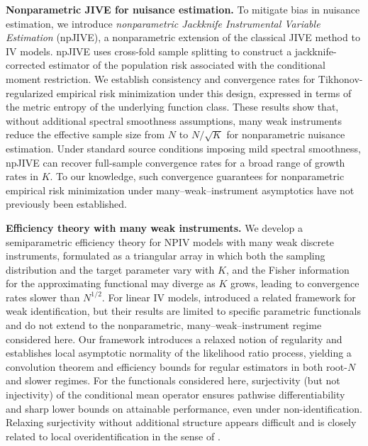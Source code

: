 \documentclass[11pt]{article}
\theoremstyle{plain}
\theoremstyle{definition}
\theoremstyle{remark}
\theoremstyle{definition}
\begin{document}
\medskip
\noindent\textbf{Nonparametric JIVE for nuisance estimation.}
To mitigate bias in nuisance estimation, we introduce \emph{nonparametric
Jackknife Instrumental Variable Estimation} (npJIVE), a nonparametric extension
of the classical JIVE method to IV models. npJIVE uses cross-fold sample
splitting to construct a jackknife-corrected estimator of the population risk
associated with the conditional moment restriction. We establish consistency and
convergence rates for Tikhonov-regularized empirical risk minimization under
this design, expressed in terms of the metric entropy of the underlying
function class. These results show that, without additional spectral smoothness
assumptions, many weak instruments reduce the effective sample size from \(N\)
to \(N/\sqrt{K}\) for nonparametric nuisance estimation. Under standard source
conditions imposing mild spectral smoothness, npJIVE can recover full-sample
convergence rates for a broad range of growth rates in \(K\). To our knowledge,
such convergence guarantees for nonparametric empirical risk minimization under
many--weak--instrument asymptotics have not previously been established.

\medskip
\noindent\textbf{Efficiency theory with many weak instruments.}
We develop a semiparametric efficiency theory for NPIV models with many weak
discrete instruments, formulated as a triangular array in which both the
sampling distribution and the target parameter vary with \(K\), and the Fisher
information for the approximating functional may diverge as \(K\) grows,
leading to convergence rates slower than \(N^{1/2}\). For linear IV models,
\citet{kaji2021theory} introduced a related framework for weak identification,
but their results are limited to specific parametric functionals and do not
extend to the nonparametric, many--weak--instrument regime considered here. Our
framework introduces a relaxed notion of regularity and establishes local
asymptotic normality of the likelihood ratio process, yielding a convolution
theorem and efficiency bounds for regular estimators in both root-\(N\) and
slower regimes. For the functionals considered here, surjectivity (but not
injectivity) of the conditional mean operator ensures pathwise differentiability
and sharp lower bounds on attainable performance, even under non-identification.
Relaxing surjectivity without additional structure appears difficult and is
closely related to local overidentification in the sense of
\citet{chen2018overidentification}.
\end{document}
